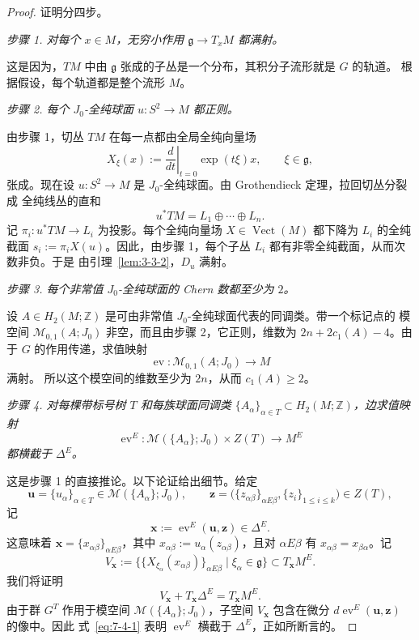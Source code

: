 \begin{proof}
证明分四步。

\emph{步骤 1. 对每个 $x\in M$，无穷小作用 $\mathfrak g\to T_xM$ 都满射。}

这是因为，$TM$ 中由 $\mathfrak g$ 张成的子丛是一个分布，其积分子流形就是 $G$ 的轨道。
根据假设，每个轨道都是整个流形 $M$。

\emph{步骤 2. 每个 $J_0$-全纯球面 $u:S^2\to M$ 都正则。}

由步骤 1，切丛 $TM$ 在每一点都由全局全纯向量场
\[
  X_\xi(x):=\left.\frac d{dt}\right|_{t=0}\exp(t\xi)x,
  \qquad \xi\in\mathfrak g,
\]
张成。现在设 $u:S^2\to M$ 是 $J_0$-全纯球面。由 Grothendieck 定理，拉回切丛分裂成
全纯线丛的直和
\[
  u^*TM=L_1\oplus\cdots\oplus L_n.
\]
记 $\pi_i:u^*TM\to L_i$ 为投影。每个全纯向量场
$X\in\operatorname{Vect}(M)$ 都下降为 $L_i$ 的全纯截面
$s_i:=\pi_iX(u)$。因此，由步骤 1，每个子丛 $L_i$ 都有非零全纯截面，从而次数非负。于是
由引理~\ref{lem:3-3-2}，$D_u$ 满射。

\emph{步骤 3. 每个非常值 $J_0$-全纯球面的 Chern 数都至少为 $2$。}

设 $A\in H_2(M;\mathbb Z)$ 是可由非常值 $J_0$-全纯球面代表的同调类。带一个标记点的
模空间 $\mathcal M_{0,1}(A;J_0)$ 非空，而且由步骤 2，它正则，维数为
$2n+2c_1(A)-4$。由于 $G$ 的作用传递，求值映射
\[
  \operatorname{ev}:\mathcal M_{0,1}(A;J_0)\longrightarrow M
\]
满射。
所以这个模空间的维数至少为 $2n$，从而 $c_1(A)\ge2$。

\emph{步骤 4. 对每棵带标号树 $T$ 和每族球面同调类
$\{A_\alpha\}_{\alpha\in T}\subset H_2(M;\mathbb Z)$，边求值映射}
\[
  \operatorname{ev}^E:
  \mathcal M(\{A_\alpha\};J_0)\times Z(T)\longrightarrow M^E
\]
\emph{都横截于 $\Delta^E$。}

这是步骤 1 的直接推论。以下论证给出细节。给定
\[
  \mathbf u=\{u_\alpha\}_{\alpha\in T}
  \in\mathcal M(\{A_\alpha\};J_0),
  \qquad
  \mathbf z=
  \bigl(\{z_{\alpha\beta}\}_{\alpha E\beta},
  \{z_i\}_{1\le i\le k}\bigr)\in Z(T),
\]
记
\[
  \mathbf x:=\operatorname{ev}^E(\mathbf u,\mathbf z)\in\Delta^E.
\]
这意味着 $\mathbf x=\{x_{\alpha\beta}\}_{\alpha E\beta}$，其中
$x_{\alpha\beta}:=u_\alpha(z_{\alpha\beta})$，且对 $\alpha E\beta$ 有
$x_{\alpha\beta}=x_{\beta\alpha}$。记
\[
  V_{\mathbf x}:=
  \bigl\{\{X_{\xi_\alpha}(x_{\alpha\beta})\}_{\alpha E\beta}
  \mid \xi_\alpha\in\mathfrak g\bigr\}
  \subset T_{\mathbf x}M^E.
\]
我们将证明
\begin{equation}\label{eq:7-4-1}
  V_{\mathbf x}+T_{\mathbf x}\Delta^E=T_{\mathbf x}M^E.
\end{equation}
由于群 $G^T$ 作用于模空间 $\mathcal M(\{A_\alpha\};J_0)$，子空间
$V_{\mathbf x}$ 包含在微分 $d\operatorname{ev}^E(\mathbf u,\mathbf z)$ 的像中。因此
式~\eqref{eq:7-4-1} 表明 $\operatorname{ev}^E$ 横截于 $\Delta^E$，正如所断言的。


\end{proof}
